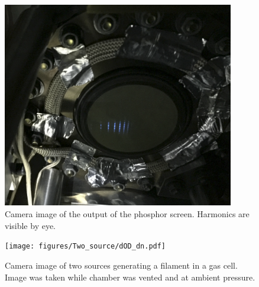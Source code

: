 \lipsum

\begin{figure}
	\centering
	\includegraphics[width=0.9\textwidth]{figures/Two_source/MCP_ts_harmonics.png}
	\caption{Camera image of the output of the phosphor screen.  Harmonics are visible by eye.}
	\label{MCP_ts_harmonics}
\end{figure}

\lipsum

\begin{figure}
	\centering
	\texttt{[image: figures/Two\_source/dOD\_dn.pdf]}
	\caption{Camera image of two sources generating a filament in a gas cell. Image was taken while chamber was vented and at ambient pressure.}
	\label{my_anita}
\end{figure}

\lipsum